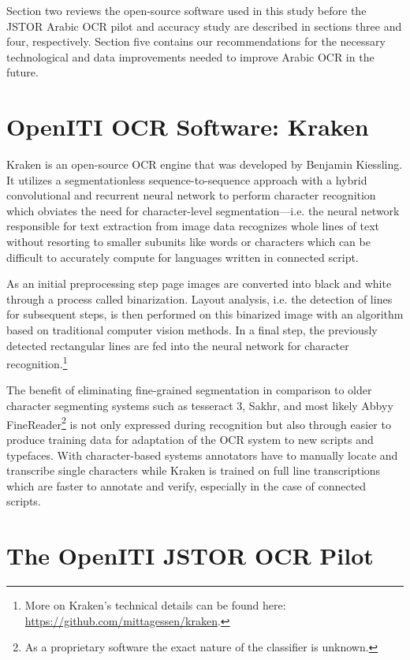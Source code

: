 Section two reviews the open-source software used in this study before the
JSTOR Arabic OCR pilot and accuracy study are described in sections three and
four, respectively. Section five contains our recommendations for the necessary
technological and data improvements needed to improve Arabic OCR in the future.  
 
\section{OpenITI OCR Software: Kraken}

Kraken is an open-source OCR engine that was developed by Benjamin Kiessling.
It utilizes a segmentationless sequence-to-sequence approach
\cite{graves2006connectionist} with a hybrid convolutional and recurrent neural
network to perform character recognition \cite{kiessling2019kraken} which
obviates the need for character-level segmentation—i.e. the neural network
responsible for text extraction from image data recognizes whole lines of text
without resorting to smaller subunits like words or characters which can be
difficult to accurately compute for languages written in connected script. 

As an initial preprocessing step page images are converted into black and white
through a process called binarization. Layout analysis, i.e. the detection of
lines for subsequent steps, is then performed on this binarized image with an
algorithm based on traditional computer vision methods. In a final step, the
previously detected rectangular lines are fed into the neural network for
character recognition.\footnote{More on Kraken’s technical details can be
found here: \url{https://github.com/mittagessen/kraken}.}

The benefit of eliminating fine-grained segmentation in comparison to older
character segmenting systems such as tesseract 3, Sakhr, and most likely Abbyy
FineReader\footnote{As a proprietary software the exact nature of the
classifier is unknown.} is not only expressed during recognition but also
through easier to produce training data for adaptation of the OCR system to new
scripts and typefaces. With character-based systems annotators have to manually
locate and transcribe single characters while Kraken is trained on full line
transcriptions which are faster to annotate and verify, especially in the case
of connected scripts.

\section{The OpenITI JSTOR OCR Pilot}

